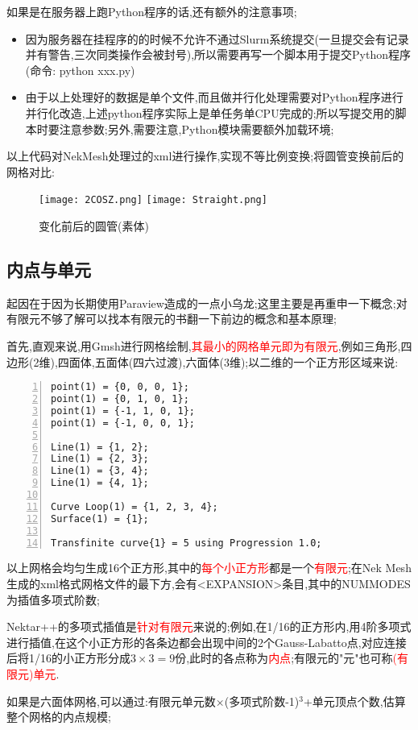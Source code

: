 如果是在服务器上跑Python程序的话,还有额外的注意事项;
\begin{itemize}
	\item{因为服务器在挂程序的的时候不允许不通过Slurm系统提交(一旦提交会有记录并有警告,三次同类操作会被封号),所以需要再写一个脚本用于提交Python程序(命令: python xxx.py)}
	\item{由于以上处理好的数据是单个文件,而且做并行化处理需要对Python程序进行并行化改造,上述python程序实际上是单任务单CPU完成的;所以写提交用的脚本时要注意参数;另外,需要注意,Python模块需要额外加载环境;}
\end{itemize}
\par
以上代码对NekMesh处理过的xml进行操作,实现不等比例变换;将圆管变换前后的网格对比:\\

\begin{figure}[h]
	\noindent
	\centering
	\texttt{[image: 2COSZ.png]}
	\quad
	\texttt{[image: Straight.png]}
	\caption{变化前后的圆管(素体)}
\end{figure}

\subsection{内点与单元}
起因在于因为长期使用Paraview造成的一点小乌龙;这里主要是再重申一下概念;对有限元不够了解可以找本有限元的书翻一下前边的概念和基本原理;\par

首先,直观来说,用Gmsh进行网格绘制,\textcolor{red}{其最小的网格单元即为有限元},例如三角形,四边形(2维),四面体,五面体(四六过渡),六面体(3维);以二维的一个正方形区域来说:
\begin{lstlisting}[numbers=left,frame=single]
point(1) = {0, 0, 0, 1};
point(1) = {0, 1, 0, 1};
point(1) = {-1, 1, 0, 1};
point(1) = {-1, 0, 0, 1};

Line(1) = {1, 2};
Line(1) = {2, 3};
Line(1) = {3, 4};
Line(1) = {4, 1};

Curve Loop(1) = {1, 2, 3, 4};
Surface(1) = {1};

Transfinite curve{1} = 5 using Progression 1.0;
\end{lstlisting}
\par
以上网格会均匀生成16个正方形,其中的\textcolor{red}{每个小正方形}都是一个\textcolor{red}{有限元};在Nek Mesh生成的xml格式网格文件的最下方,会有<EXPANSION>条目,其中的NUMMODES为插值多项式阶数;\par
Nektar++的多项式插值是\textcolor{red}{针对有限元}来说的;例如,在1/16的正方形内,用4阶多项式进行插值,在这个小正方形的各条边都会出现中间的2个Gauss-Labatto点,对应连接后将1/16的小正方形分成$3\times 3 = 9$份,此时的各点称为\textcolor{red}{内点};有限元的"元"也可称\textcolor{red}{(有限元)单元}.\par
如果是六面体网格,可以通过:有限元单元数$\times$(多项式阶数-1)$^3$+单元顶点个数,估算整个网格的内点规模;



